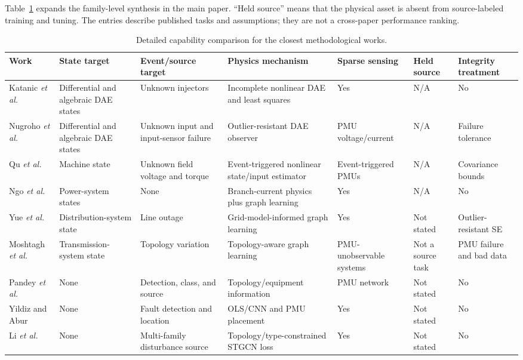 \documentclass{ieeeaccess}
\begin{document}
Table~\ref{tab:supp-literature} expands the family-level synthesis in the main paper. ``Held source'' means that the physical asset is absent from source-labeled training and tuning. The entries describe published tasks and assumptions; they are not a cross-paper performance ranking.

\begin{table}[t]
\caption{Detailed capability comparison for the closest methodological works.}
\label{tab:supp-literature}
\centering
\scriptsize
\begin{tabularx}{\textwidth}{@{}lXXXXXX@{}}
\toprule
Work & State target & Event/source target & Physics mechanism & Sparse sensing & Held source & Integrity treatment \\
\midrule
Katanic \emph{et al.} \cite{katanic2024recursive} & Differential and algebraic DAE states & Unknown injectors & Incomplete nonlinear DAE and least squares & Yes & N/A & No \\
Nugroho \emph{et al.} \cite{nugroho2022dae} & Differential and algebraic DAE states & Unknown input and input-sensor failure & Outlier-resistant DAE observer & PMU voltage/current & N/A & Failure tolerance \\
Qu \emph{et al.} \cite{qu2023joint} & Machine state & Unknown field voltage and torque & Event-triggered nonlinear state/input estimator & Event-triggered PMUs & N/A & Covariance bounds \\
Ngo \emph{et al.} \cite{ngo2024pignn} & Power-system states & None & Branch-current physics plus graph learning & Yes & N/A & No \\
Yue \emph{et al.} \cite{yue2024graph} & Distribution-system state & Line outage & Grid-model-informed graph learning & Yes & Not stated & Outlier-resistant SE \\
Moshtagh \emph{et al.} \cite{moshtagh2025topology} & Transmission-system state & Topology variation & Topology-aware graph learning & PMU-unobservable systems & Not a source task & PMU failure and bad data \\
Pandey \emph{et al.} \cite{pandey2020realtime} & None & Detection, class, and source & Topology/equipment information & PMU network & Not stated & No \\
Yildiz and Abur \cite{yildiz2024few} & None & Fault detection and location & OLS/CNN and PMU placement & Yes & Not stated & No \\
Li \emph{et al.} \cite{li2024knowledge} & None & Multi-family disturbance source & Topology/type-constrained STGCN loss & Yes & Not stated & No \\

\end{tabularx}
\end{table}
\end{document}
